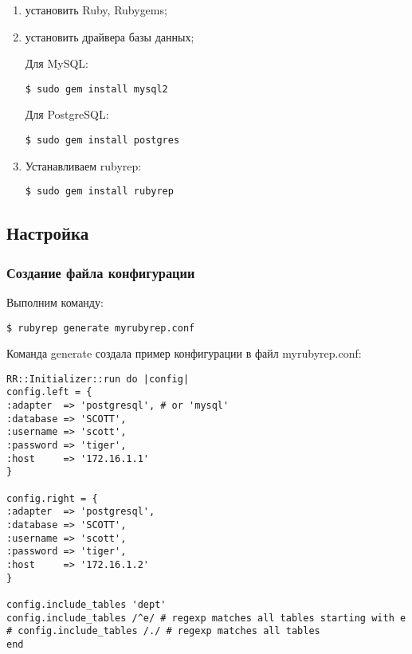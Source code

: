 \begin{enumerate}
  \item установить Ruby, Rubygems;
  \item установить драйвера базы данных;

  Для MySQL:
  \begin{lstlisting}[label=lst:rubyrep1,caption=Установка]
  $ sudo gem install mysql2
  \end{lstlisting}

  Для PostgreSQL:
  \begin{lstlisting}[label=lst:rubyrep2,caption=Установка]
  $ sudo gem install postgres
  \end{lstlisting}

  \item Устанавливаем rubyrep:
  \begin{lstlisting}[label=lst:rubyrep3,caption=Установка]
  $ sudo gem install rubyrep
  \end{lstlisting}
\end{enumerate}


\subsection{Настройка}

\subsubsection{Создание файла конфигурации}

Выполним команду:

\begin{lstlisting}[label=lst:rubyrep4,caption=Настройка]
$ rubyrep generate myrubyrep.conf
\end{lstlisting}

Команда generate создала пример конфигурации в файл myrubyrep.conf:

\begin{lstlisting}[label=lst:rubyrep5,caption=Настройка]
RR::Initializer::run do |config|
config.left = {
:adapter  => 'postgresql', # or 'mysql'
:database => 'SCOTT',
:username => 'scott',
:password => 'tiger',
:host     => '172.16.1.1'
}

config.right = {
:adapter  => 'postgresql',
:database => 'SCOTT',
:username => 'scott',
:password => 'tiger',
:host     => '172.16.1.2'
}

config.include_tables 'dept'
config.include_tables /^e/ # regexp matches all tables starting with e
# config.include_tables /./ # regexp matches all tables
end
\end{lstlisting}


